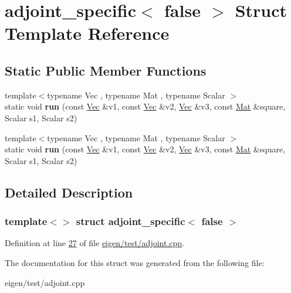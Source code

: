 \hypertarget{structadjoint__specific_3_01false_01_4}{}\section{adjoint\+\_\+specific$<$ false $>$ Struct Template Reference}
\label{structadjoint__specific_3_01false_01_4}
\subsection*{Static Public Member Functions}
\begin{DoxyCompactItemize}
\item 
\mbox{\label{structadjoint__specific_3_01false_01_4_aa5f31ac7355813ed313acd8dfb57a85b}} 
{\footnotesize template$<$typename Vec , typename Mat , typename Scalar $>$ }\\static void {\bfseries run} (const \hyperlink{group___core___module_class_eigen_1_1_matrix}{Vec} \&v1, const \hyperlink{group___core___module_class_eigen_1_1_matrix}{Vec} \&v2, \hyperlink{group___core___module_class_eigen_1_1_matrix}{Vec} \&v3, const \hyperlink{group___core___module}{Mat} \&square, Scalar s1, Scalar s2)
\item 
\mbox{\label{structadjoint__specific_3_01false_01_4_aa5f31ac7355813ed313acd8dfb57a85b}} 
{\footnotesize template$<$typename Vec , typename Mat , typename Scalar $>$ }\\static void {\bfseries run} (const \hyperlink{group___core___module_class_eigen_1_1_matrix}{Vec} \&v1, const \hyperlink{group___core___module_class_eigen_1_1_matrix}{Vec} \&v2, \hyperlink{group___core___module_class_eigen_1_1_matrix}{Vec} \&v3, const \hyperlink{group___core___module}{Mat} \&square, Scalar s1, Scalar s2)
\end{DoxyCompactItemize}


\subsection{Detailed Description}
\subsubsection*{template$<$$>$\newline
struct adjoint\+\_\+specific$<$ false $>$}



Definition at line \hyperlink{eigen_2test_2adjoint_8cpp_source_l00027}{27} of file \hyperlink{eigen_2test_2adjoint_8cpp_source}{eigen/test/adjoint.\+cpp}.



The documentation for this struct was generated from the following file\+:\begin{DoxyCompactItemize}
\item 
eigen/test/adjoint.\+cpp\end{DoxyCompactItemize}
